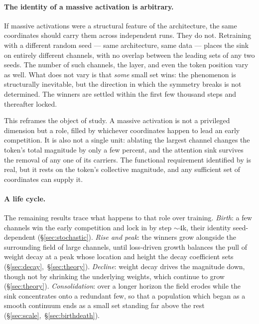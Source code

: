 \documentclass[11pt]{article}
\begin{document}
\paragraph{The identity of a massive activation is arbitrary.} If massive
activations were a structural feature of the architecture, the same coordinates
should carry them across independent runs. They do not. Retraining with a different
random seed --- same architecture, same data --- places the sink on entirely
different channels, with no overlap between the leading sets of any two seeds. The
number of such channels, the layer, and even the token position vary as well. What
does not vary is that \emph{some} small set wins: the phenomenon is structurally
inevitable, but the direction in which the symmetry breaks is not determined. The
winners are settled within the first few thousand steps and thereafter locked.

This reframes the object of study. A massive activation is not a privileged
dimension but a role, filled by whichever coordinates happen to lead an early
competition. It is also not a single unit: ablating the largest channel changes the
token's total magnitude by only a few percent, and the attention sink survives the
removal of any one of its carriers. The functional requirement identified by
\citet{chen2026gradient} is real, but it rests on the token's collective magnitude,
and any sufficient set of coordinates can supply it.

\paragraph{A life cycle.} The remaining results trace what happens to that role over
training. \emph{Birth}: a few channels win the early competition and lock in by step
${\sim}4$k, their identity seed-dependent (\S\ref{sec:stochastic}). \emph{Rise and
peak}: the winners grow alongside the surrounding field of large channels, until
loss-driven growth balances the pull of weight decay at a peak whose location and
height the decay coefficient sets (\S\ref{sec:decay},~\S\ref{sec:theory}).
\emph{Decline}: weight decay drives the magnitude down, though not by shrinking the
underlying weights, which continue to grow (\S\ref{sec:theory}).
\emph{Consolidation}: over a longer horizon the field erodes while the sink
concentrates onto a redundant few, so that a population which began as a smooth
continuum ends as a small set standing far above the rest
(\S\ref{sec:scale},~\S\ref{sec:birthdeath}).
\end{document}

